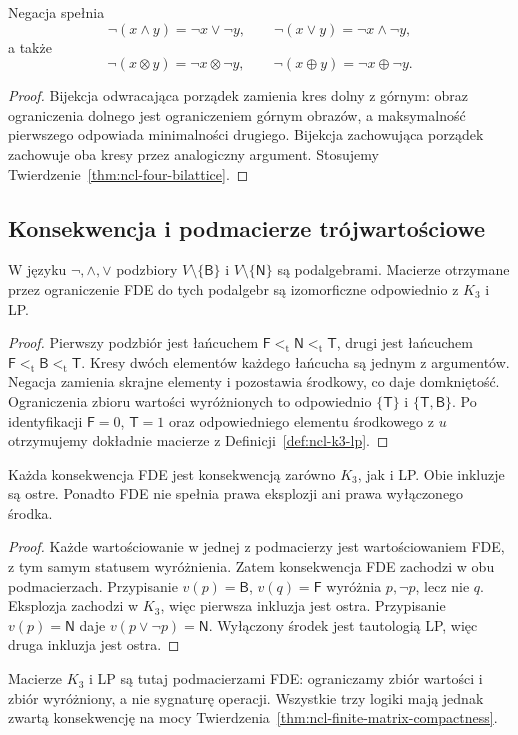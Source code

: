 \begin{stwierdzenie}
\label{prop:ncl-four-demorgan}
Negacja spełnia
\[
 \neg(x\wedge y)=\neg x\vee\neg y,\qquad
 \neg(x\vee y)=\neg x\wedge\neg y,
\]
a także
\[
 \neg(x\otimes y)=\neg x\otimes\neg y,\qquad
 \neg(x\oplus y)=\neg x\oplus\neg y.
\]
\end{stwierdzenie}
\begin{proof}
Bijekcja odwracająca porządek zamienia kres dolny
z górnym: obraz ograniczenia dolnego jest ograniczeniem
górnym obrazów, a maksymalność pierwszego odpowiada
minimalności drugiego. Bijekcja zachowująca porządek
zachowuje oba kresy przez analogiczny argument.
Stosujemy Twierdzenie~\ref{thm:ncl-four-bilattice}.
\end{proof}

\subsection{Konsekwencja i podmacierze trójwartościowe}
\begin{stwierdzenie}
\label{prop:ncl-four-reducts}
W języku $\neg,\wedge,\vee$ podzbiory
$V\setminus\{\mathsf B\}$ i
$V\setminus\{\mathsf N\}$ są podalgebrami.
Macierze otrzymane przez ograniczenie FDE do tych
podalgebr są izomorficzne odpowiednio z $K_3$ i LP.
\end{stwierdzenie}
\begin{proof}
Pierwszy podzbiór jest łańcuchem
$\mathsf F<_{\mathrm t}\mathsf N<_{\mathrm t}\mathsf T$,
drugi jest łańcuchem
$\mathsf F<_{\mathrm t}\mathsf B<_{\mathrm t}\mathsf T$.
Kresy dwóch elementów każdego łańcucha są jednym
z argumentów. Negacja zamienia skrajne elementy
i pozostawia środkowy, co daje domkniętość.
Ograniczenia zbioru wartości wyróżnionych to odpowiednio
$\{\mathsf T\}$ i $\{\mathsf T,\mathsf B\}$.
Po identyfikacji $\mathsf F=0$, $\mathsf T=1$ oraz
odpowiedniego elementu środkowego z $u$ otrzymujemy
dokładnie macierze z Definicji~\ref{def:ncl-k3-lp}.
\end{proof}

\begin{wniosek}
\label{cor:ncl-four-consequences}
Każda konsekwencja FDE jest konsekwencją zarówno
$K_3$, jak i LP. Obie inkluzje są ostre.
Ponadto FDE nie spełnia prawa eksplozji ani
prawa wyłączonego środka.
\end{wniosek}
\begin{proof}
Każde wartościowanie w jednej z podmacierzy jest
wartościowaniem FDE, z tym samym statusem wyróżnienia.
Zatem konsekwencja FDE zachodzi w obu podmacierzach.
Przypisanie $v(p)=\mathsf B$, $v(q)=\mathsf F$
wyróżnia $p,\neg p$, lecz nie $q$. Eksplozja zachodzi
w $K_3$, więc pierwsza inkluzja jest ostra.
Przypisanie $v(p)=\mathsf N$ daje
$v(p\vee\neg p)=\mathsf N$. Wyłączony środek
jest tautologią LP, więc druga inkluzja jest ostra.
\end{proof}
Macierze $K_3$ i LP są tutaj podmacierzami FDE:
ograniczamy zbiór wartości i zbiór wyróżniony,
a nie sygnaturę operacji. Wszystkie trzy logiki
mają jednak zwartą konsekwencję
na mocy Twierdzenia~\ref{thm:ncl-finite-matrix-compactness}.

